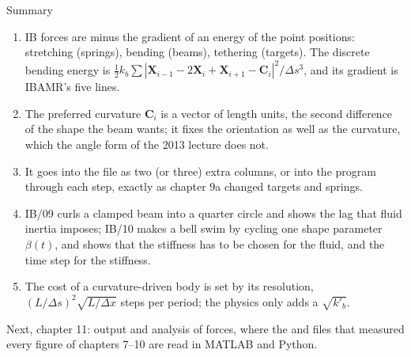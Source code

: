 \documentclass[aspectratio=169,11pt]{beamer}
\begin{document}
\begin{frame}{Summary}
\label{fr:summary}
\footnotesize
\begin{enumerate}
  \item IB forces are minus the gradient of an energy of the point positions: stretching (springs), bending (beams), tethering (targets). The discrete bending energy is $\frac12 k_b \sum |\mathbf{X}_{i-1} - 2\mathbf{X}_i + \mathbf{X}_{i+1} - \mathbf{C}_i|^2/\Delta s^3$, and its gradient is IBAMR's five lines.
  \item The preferred curvature $\mathbf{C}_i$ is a vector of length units, the second difference of the shape the beam wants; it fixes the orientation as well as the curvature, which the angle form of the 2013 lecture does not.
  \item It goes into the  file as two (or three) extra columns, or into the program through  each step, exactly as chapter 9a changed targets and springs.
  \item IB/09 curls a clamped beam into a quarter circle and shows the lag that fluid inertia imposes; IB/10 makes a bell swim by cycling one shape parameter $\beta(t)$, and shows that the stiffness has to be chosen for the fluid, and the time step for the stiffness.
  \item The cost of a curvature-driven body is set by its resolution, $(L/\Delta s)^2\sqrt{L/\Delta x}$ steps per period; the physics only adds a $\sqrt{k'_b}$.
\end{enumerate}
\begin{homebox}
\footnotesize Next, chapter 11: output and analysis of forces, where the  and  files that measured every figure of chapters 7--10 are read in MATLAB and Python.
\end{homebox}
\end{frame}
\end{document}
